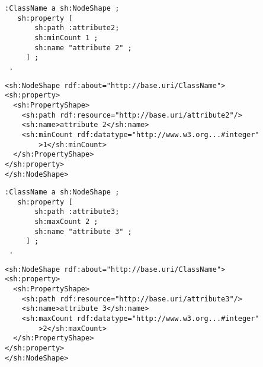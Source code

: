 \vspace{-\parskip}
\begin{minipage}[b]{.385\textwidth}
\begin{lstlisting}[language=Turtle, caption={Min cardinality constraint in Turtle syntax}, captionpos=b]
 :ClassName a sh:NodeShape ;
   sh:property [
       sh:path :attribute2;
       sh:minCount 1 ;
       sh:name "attribute 2" ;
     ] ;
 .
\end{lstlisting}
\end{minipage}%
\quad\vspace{-\parskip}
\begin{minipage}[b]{.6\textwidth}
\begin{lstlisting}[language=RDF/XML, caption={Min cardinality constraint in RDF/XML syntax}, captionpos=b]
<sh:NodeShape rdf:about="http://base.uri/ClassName">
<sh:property>
  <sh:PropertyShape>
    <sh:path rdf:resource="http://base.uri/attribute2"/>
    <sh:name>attribute 2</sh:name>
    <sh:minCount rdf:datatype="http://www.w3.org...#integer"
        >1</sh:minCount>
  </sh:PropertyShape>
</sh:property>
</sh:NodeShape>
\end{lstlisting}
\end{minipage}
\vspace{-\parskip}

\vspace{-\parskip}
\begin{minipage}[b]{.385\textwidth}
\begin{lstlisting}[language=Turtle, caption={Max cardinality constraint in Turtle syntax}, captionpos=b]
 :ClassName a sh:NodeShape ;
   sh:property [
       sh:path :attribute3;
       sh:maxCount 2 ;
       sh:name "attribute 3" ;
     ] ;
 .
\end{lstlisting}
\end{minipage}%
\quad\vspace{-\parskip}
\begin{minipage}[b]{.6\textwidth}
\begin{lstlisting}[language=RDF/XML, caption={Max cardinality constraint in RDF/XML syntax}, captionpos=b]
<sh:NodeShape rdf:about="http://base.uri/ClassName">
<sh:property>
  <sh:PropertyShape>
    <sh:path rdf:resource="http://base.uri/attribute3"/>
    <sh:name>attribute 3</sh:name>
    <sh:maxCount rdf:datatype="http://www.w3.org...#integer"
        >2</sh:maxCount>        
  </sh:PropertyShape>
</sh:property>
</sh:NodeShape>
\end{lstlisting}
\end{minipage}
\vspace{-\parskip}

